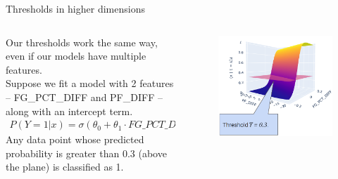 \documentclass[aspectratio=169]{../latex_main/tntbeamer}  %
\begin{document}
	
	\begin{frame}{Thresholds in higher dimensions}
	    \begin{columns}
	        \begin{column}{.7\textwidth}
	                Our thresholds work the same way, even if our models have multiple features.\\
	                \bigskip
	                Suppose we fit a model with 2 features – FG\_PCT\_DIFF and PF\_DIFF – along with an intercept term.
	                \begin{align*}
	                    P(Y=1|x) = \sigma (\theta_0  + \theta_1 \cdot FG\_PCT\_DIFF + \theta_2 \cdot PF\_DIFF)
	                \end{align*}
	                Any data point whose predicted probability is greater than 0.3 (above the plane) is classified as 1.
	        \end{column}
	        
	        
	        \begin{column}{.4\textwidth}
	                \begin{figure}
	                    \centering
	                    \includegraphics[scale=.35]{Bild5}
	                \end{figure}
	        \end{column}
	    \end{columns}
	\end{frame}
	
\end{document}
